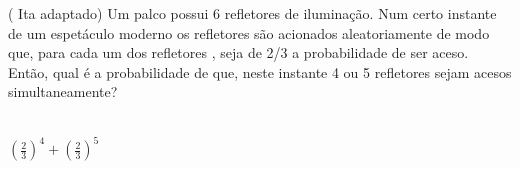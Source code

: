 \begin{ex}
( Ita adaptado) Um palco possui 6 refletores de iluminação. Num certo instante de um espetáculo moderno os refletores são acionados aleatoriamente  de modo que, para cada um dos refletores , seja de 2/3 a probabilidade de ser aceso. Então, qual é a probabilidade de que, neste instante 4 ou 5 refletores sejam acesos simultaneamente?
  \begin{sol}
   \phantom{A}\\
   $(\frac{2}{3})^4+(\frac{2}{3})^5$
  \end{sol}
\end{ex}